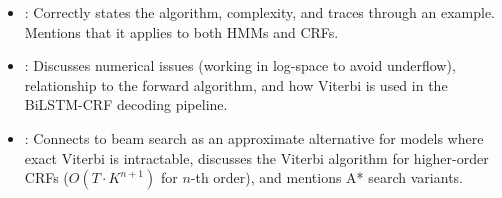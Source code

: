 \begin{interviewq}

\goodgreat
\begin{itemize}
    \item {}: Correctly states the algorithm, complexity, and traces
          through an example.  Mentions that it applies to both HMMs and CRFs.
    \item {}: Discusses numerical issues (working in log-space to
          avoid underflow), relationship to the forward algorithm, and how
          Viterbi is used in the BiLSTM-CRF decoding pipeline.
    \item {}: Connects to beam search as an approximate
          alternative for models where exact Viterbi is intractable, discusses
          the Viterbi algorithm for higher-order CRFs ($O(T \cdot K^{n+1})$
          for $n$-th order), and mentions A* search variants.
\end{itemize}

\end{interviewq}

\vspace{0.5em}

